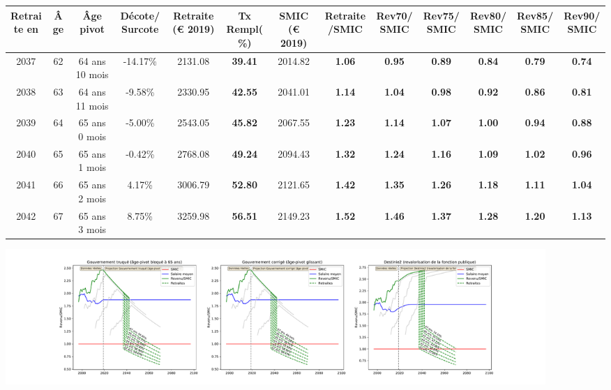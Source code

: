 { \scriptsize \begin{center} 
\begin{tabular}[htb]{|c|c||c|c||c|c||c||c|c|c|c|c|c|} 
\hline 
 Retraite en &  Âge &  Âge pivot &  Décote/Surcote &  Retraite (\euro{} 2019) &  Tx Rempl(\%) &  SMIC (\euro{} 2019) &  Retraite/SMIC &  Rev70/SMIC &  Rev75/SMIC &  Rev80/SMIC &  Rev85/SMIC &  Rev90/SMIC \\ 
\hline \hline 
 2037 &  62 &  64 ans 10 mois &  -14.17\% &  2131.08 &  {\bf 39.41} &  2014.82 &  {\bf 1.06} &  {\bf {\color{red} 0.95}} &  {\bf {\color{red} 0.89}} &  {\bf {\color{red} 0.84}} &  {\bf {\color{red} 0.79}} &  {\bf {\color{red} 0.74}} \\ 
\hline 
 2038 &  63 &  64 ans 11 mois &  -9.58\% &  2330.95 &  {\bf 42.55} &  2041.01 &  {\bf 1.14} &  {\bf 1.04} &  {\bf {\color{red} 0.98}} &  {\bf {\color{red} 0.92}} &  {\bf {\color{red} 0.86}} &  {\bf {\color{red} 0.81}} \\ 
\hline 
 2039 &  64 &  65 ans 0 mois &  -5.00\% &  2543.05 &  {\bf 45.82} &  2067.55 &  {\bf 1.23} &  {\bf 1.14} &  {\bf 1.07} &  {\bf 1.00} &  {\bf {\color{red} 0.94}} &  {\bf {\color{red} 0.88}} \\ 
\hline 
 2040 &  65 &  65 ans 1 mois &  -0.42\% &  2768.08 &  {\bf 49.24} &  2094.43 &  {\bf 1.32} &  {\bf 1.24} &  {\bf 1.16} &  {\bf 1.09} &  {\bf 1.02} &  {\bf {\color{red} 0.96}} \\ 
\hline 
 2041 &  66 &  65 ans 2 mois &  4.17\% &  3006.79 &  {\bf 52.80} &  2121.65 &  {\bf 1.42} &  {\bf 1.35} &  {\bf 1.26} &  {\bf 1.18} &  {\bf 1.11} &  {\bf 1.04} \\ 
\hline 
 2042 &  67 &  65 ans 3 mois &  8.75\% &  3259.98 &  {\bf 56.51} &  2149.23 &  {\bf 1.52} &  {\bf 1.46} &  {\bf 1.37} &  {\bf 1.28} &  {\bf 1.20} &  {\bf 1.13} \\ 
\hline 
\hline 
\end{tabular} 
\end{center} } 

 \begin{center}\includegraphics[width=0.9\textwidth]{fig/ProfCertifie_1975_22_dest_retraite.pdf}\end{center} \label{fig/ProfCertifie_1975_22_dest_retraite.pdf} 

